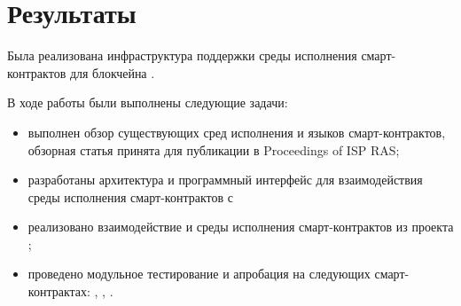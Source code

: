 \section{Результаты}
Была реализована инфраструктура поддержки среды исполнения смарт-контрактов для блокчейна .

В ходе работы были выполнены следующие задачи:
\begin{itemize}
    \item выполнен обзор существующих сред исполнения и языков смарт-контрактов, обзорная статья принята для публикации в Pro\-ceed\-ings of ISP RAS;
    \item разработаны архитектура и программный интерфейс для взаимодействия среды исполнения смарт-контрактов с 
    \item реализовано взаимодействие  и среды исполнения смарт-контрактов из проекта ;
    \item проведено модульное тестирование и апробация на следующих смарт-контрактах: , , .
\end{itemize}

